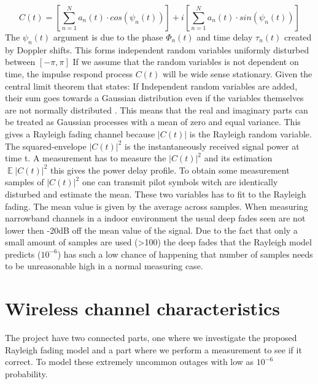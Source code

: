 \begin{equation}
C(t) = \left [ \sum_{n =1}^{N} a_n(t)\cdot cos(\psi_n (t))\right ] + i\left [\sum_{n =1}^{N} a_n(t)\cdot sin(\psi_n (t))  \right ]
\end{equation}
The $\psi_n(t)$ argument is due to the phase $\Phi_n(t)$ and time delay $\tau_n(t)$ created by Doppler shifts. This forms independent random variables  uniformly disturbed between $[-\pi,\pi]$
If we assume that the random variables is not dependent on time, the impulse respond process $C(t)$ will be wide sense stationary. Given the central limit theorem that states:
If Independent random variables are added, their sum goes towards a Gaussian distribution even if the variables themselves are not normally distributed \citep{CentralLimit}.  
This means that the real and imaginary parts can be treated as Gaussian processes with a mean of zero and equal variance. This gives a Rayleigh fading channel because $ \left | C(t) \right | $ is the Rayleigh random variable. The squared-envelope $ \left | C(t) \right |^2 $ is the instantaneously received signal power at time t.
A measurement has to measure the $ \left | C(t) \right |^2 $ and its estimation $ \mathop{\mathbb{E}}\left | C(t) \right |^2 $ this gives the power delay profile. To obtain some measurement samples of $ \left | C(t) \right |^2 $ one can transmit pilot symbols witch are identically disturbed and estimate the mean.\citep{MeasurementComplexRay}
These two variables has to fit to the Rayleigh fading. The mean value is given by the average across samples.
When measuring narrowband channels in a indoor environment the usual deep fades seen are not lower then -20dB off the mean value of the signal. Due to the fact that only a small amount of samples are used (>100) the deep fades that the Rayleigh model predicts ($10^{-6}$) has such a low chance of happening that number of samples needs to be unreasonable high in a normal measuring case.




\section{Wireless channel characteristics}
The project have two connected parts, one where we investigate the proposed Rayleigh fading model and a part where we perform a measurement to see if it correct.  To model these extremely uncommon outages with low as $10^{-6}$ probability.

